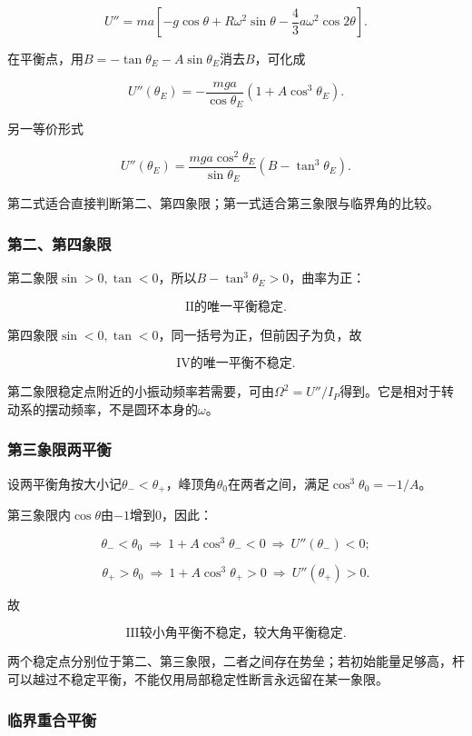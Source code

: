 \documentclass[12pt,a4paper,fontset=fandol]{ctexart}
\begin{document}
\[
U''=ma\left[-g\cos\theta+R\omega^2\sin\theta
-\frac43a\omega^2\cos2\theta\right].
\]

在平衡点，用\(B=-\tan\theta_E-A\sin\theta_E\)消去\(B\)，可化成

\[
\boxed{
U''(\theta_E)
=-\frac{mga}{\cos\theta_E}
(1+A\cos^3\theta_E)}.
\]

另一等价形式

\[
U''(\theta_E)
=\frac{mga\cos^2\theta_E}{\sin\theta_E}
(B-\tan^3\theta_E).
\]

第二式适合直接判断第二、第四象限；第一式适合第三象限与临界角的比较。

\subsubsection{第二、第四象限}\label{ux7b2cux4e8cux7b2cux56dbux8c61ux9650}

第二象限\(\sin>0,\tan<0\)，所以\(B-\tan^3\theta_E>0\)，曲率为正：

\[
\boxed{\mathrm{II}\text{的唯一平衡稳定}}.
\]

第四象限\(\sin<0,\tan<0\)，同一括号为正，但前因子为负，故

\[
\boxed{\mathrm{IV}\text{的唯一平衡不稳定}}.
\]

第二象限稳定点附近的小振动频率若需要，可由\(\Omega^2=U''/I_P\)得到。它是相对于转动系的摆动频率，不是圆环本身的\(\omega\)。

\subsubsection{第三象限两平衡}\label{ux7b2cux4e09ux8c61ux9650ux4e24ux5e73ux8861}

设两平衡角按大小记\(\theta_-<\theta_+\)，峰顶角\(\theta_0\)在两者之间，满足\(\cos^3\theta_0=-1/A\)。

第三象限内\(\cos\theta\)由\(-1\)增到0，因此：

\[
\theta_-<\theta_0
\ \Longrightarrow\ 1+A\cos^3\theta_-<0
\ \Longrightarrow\ U''(\theta_-)<0;
\]

\[
\theta_+>\theta_0
\ \Longrightarrow\ 1+A\cos^3\theta_+>0
\ \Longrightarrow\ U''(\theta_+)>0.
\]

故

\[
\boxed{\mathrm{III}\text{较小角平衡不稳定，较大角平衡稳定}}.
\]

两个稳定点分别位于第二、第三象限，二者之间存在势垒；若初始能量足够高，杆可以越过不稳定平衡，不能仅用局部稳定性断言永远留在某一象限。

\subsubsection{临界重合平衡}\label{ux4e34ux754cux91cdux5408ux5e73ux8861}
\end{document}

